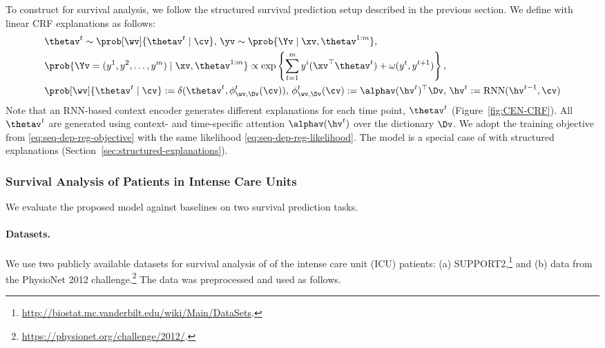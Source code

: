\documentclass[twoside,11pt]{article}
\begin{document}
To construct {\CEN} for survival analysis, we follow the structured survival prediction setup described in the previous section.
We define {\CEN} with linear CRF explanations as follows:
\begin{equation}
\label{eq:CEN-CRF}
\begin{aligned}
    & \thetav^t \sim \prob[\wv]{\thetav^t \mid \cv},\, \yv \sim \prob{\Yv \mid \xv, \thetav^{1:m}}, \\
    & \prob{\Yv = (y^1, y^2, \dots, y^m) \mid \xv, \thetav^{1:m}} \propto \exp\left\{\sum_{t=1}^m y^i (\xv^\top \thetav^t) + \omega(y^t, y^{t + 1})\right\}, \\
    & \prob[\wv]{\thetav^t \mid \cv} := \delta(\thetav^t, \phi^t_{\wv, \Dv}(\cv)),\, \phi^t_{\wv, \Dv}(\cv) := \alphav(\hv^{t})^\top \Dv,\, \hv^t := \mathrm{RNN}(\hv^{t-1}, \cv)
    \end{aligned}
\end{equation}
Note that an RNN-based context encoder generates different explanations for each time point, $\thetav^{t}$ (Figure~\ref{fig:CEN-CRF}).
All $\thetav^{t}$ are generated using context- and time-specific attention $\alphav(\hv^t)$ over the dictionary $\Dv$.
We adopt the training objective from \eqref{eq:seq-dep-reg-objective} with the same likelihood \eqref{eq:seq-dep-reg-likelihood}.
The model is a special case of {\CENs} with structured explanations (Section~\ref{sec:structured-explanations}).


\subsubsection{Survival Analysis of Patients in Intense Care Units}
\label{sec:survival-analysis-experiments}

We evaluate the proposed model against baselines on two survival prediction tasks.

\paragraph{Datasets.}
We use two publicly available datasets for survival analysis of of the intense care unit (ICU) patients:
(a) SUPPORT2,\footnote{\url{http://biostat.mc.vanderbilt.edu/wiki/Main/DataSets}.} and
(b) data from the PhysioNet 2012 challenge.\footnote{\url{https://physionet.org/challenge/2012/}.}
The data was preprocessed and used as follows.
\end{document}
